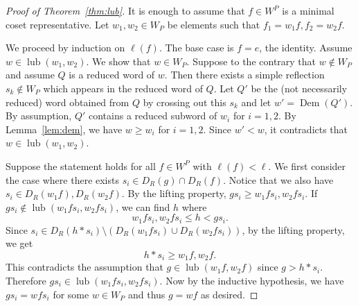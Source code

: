 \documentclass[12pt,reqno]{amsart}
\theoremstyle{definition}
\newcommand{\lub}{\operatorname{lub}}
\newcommand{\dem}{\operatorname{Dem}}
\begin{document}
{\begin{proof}[Proof of Theorem~\ref{thm:lub}]
    It is enough to assume that $f\in W^P$ is a minimal coset representative. Let $w_1,w_2\in W_P$ be elements such that $f_1 = w_1f, f_2 = w_2f$. 
    
    We proceed by induction on $\ell(f)$. The base case is $f=e$, the identity. Assume $w\in \lub(w_1,w_2)$. We show that $w\in W_P$. Suppose to the contrary that $w\not\in W_P$ and assume $Q$ is a reduced word of $w$. Then there exists a simple reflection $s_k\not \in W_P$ which appears in the reduced word of $Q$. Let $Q'$ be the (not necessarily reduced) word obtained from $Q$ by crossing out this $s_k$ and let $w'=\dem(Q')$. By assumption, $Q'$ contains a reduced subword of $w_i$ for $i=1,2$. By Lemma~\ref{lem:dem}, we have $w\ge w_i$ for $i=1,2$. Since $w'<w$, it contradicts that $w\in \lub(w_1, w_2)$.

    Suppose the statement holds for all $f\in W^P$ with $\ell(f)< \ell$. We first consider the case where there exists $s_i \in D_{R}(g)\cap D_{R}(f)$. Notice that we also have $s_i \in D_{R}(w_1f),D_{R}(w_2f)$. By the lifting property, $gs_i\geq w_1fs_i,w_2fs_i$. If $gs_i\notin \lub(w_1fs_i,w_2fs_i)$, we can find $h$ where 
    \[w_1fs_i,w_2fs_i \leq h<gs_i.\]
    Since $s_i\in D_{R}(h\ast s_i)\setminus (D_{R}(w_1fs_i)\cup D_{R}(w_2fs_i))$, by the lifting property, we get 
    \[h\ast s_i \geq w_1f,w_2f.\]
    This contradicts the assumption that $g\in \lub(w_1f,w_2f)$ since $g>h\ast s_i$. Therefore $gs_i\in \lub(w_1fs_i,w_2fs_i)$.  Now by the inductive hypothesis, we have $gs_i = wfs_i$ for some $w\in W_P$ and thus $g = wf$ as desired.


\end{proof}}
\end{document}
